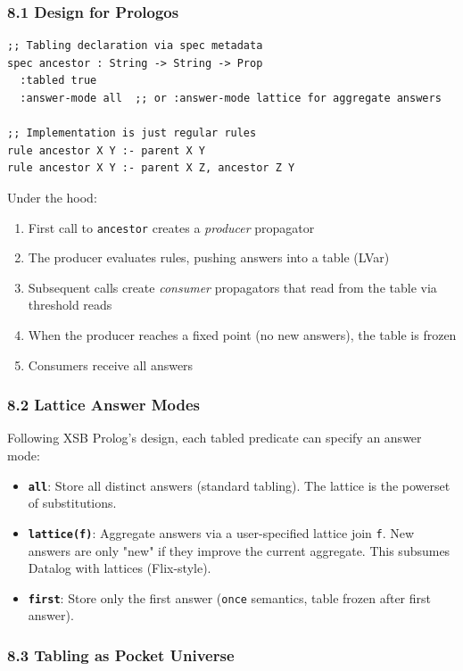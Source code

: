 \documentclass[11pt]{article}
\begin{document}
\subsubsection{8.1 Design for Prologos}
\label{sec:orgda551bd}

\begin{verbatim}
;; Tabling declaration via spec metadata
spec ancestor : String -> String -> Prop
  :tabled true
  :answer-mode all  ;; or :answer-mode lattice for aggregate answers

;; Implementation is just regular rules
rule ancestor X Y :- parent X Y
rule ancestor X Y :- parent X Z, ancestor Z Y
\end{verbatim}

Under the hood:
\begin{enumerate}
\item First call to \texttt{ancestor} creates a \emph{producer} propagator
\item The producer evaluates rules, pushing answers into a table (LVar)
\item Subsequent calls create \emph{consumer} propagators that read from the table
via threshold reads
\item When the producer reaches a fixed point (no new answers), the table is frozen
\item Consumers receive all answers
\end{enumerate}
\subsubsection{8.2 Lattice Answer Modes}
\label{sec:orgd8e6395}

Following XSB Prolog's design, each tabled predicate can specify an answer
mode:

\begin{itemize}
\item \textbf{\texttt{all}}: Store all distinct answers (standard tabling). The lattice is
the powerset of substitutions.
\item \textbf{\texttt{lattice(f)}}: Aggregate answers via a user-specified lattice join \texttt{f}.
New answers are only "new" if they improve the current aggregate.
This subsumes Datalog with lattices (Flix-style).
\item \textbf{\texttt{first}}: Store only the first answer (\texttt{once} semantics, table frozen
after first answer).
\end{itemize}
\subsubsection{8.3 Tabling as Pocket Universe}
\label{sec:org9bcefca}
\end{document}
